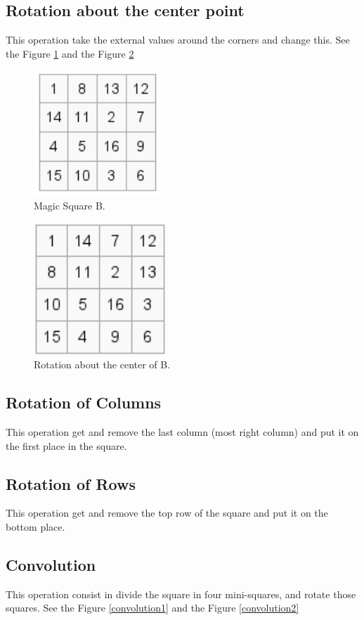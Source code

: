 \documentclass[12pt]{article}
\begin{document}
\subsection{Rotation about the center point}
This operation take the external values around the corners and change this. See the Figure \ref{rotationcenter1} and the Figure \ref{rotationcenter2}
\begin{figure}[h!]
 	\centering
  	\includegraphics[scale=0.3]
  	{Images/rotationcenter1.png}
  	\caption{Magic Square B.}
     \label{rotationcenter1}
\end{figure}
\begin{figure}[h!]
 	\centering
  	\includegraphics[scale=0.3]
  	{Images/rotationcenter2.png}
  	\caption{Rotation about the center of B.}
 \label{rotationcenter2}
\end{figure}

\subsection{Rotation of Columns}
This operation get and remove the last  column (most right column) and put it on the first place in the square.

\subsection{Rotation of Rows}
This operation get and remove the top row of the square and put it on the bottom place.
\subsection{Convolution}
This operation consist in divide the square in four mini-squares, and rotate those squares. See the Figure \ref{convolution1} and the Figure \ref{convolution2}
\end{document}
